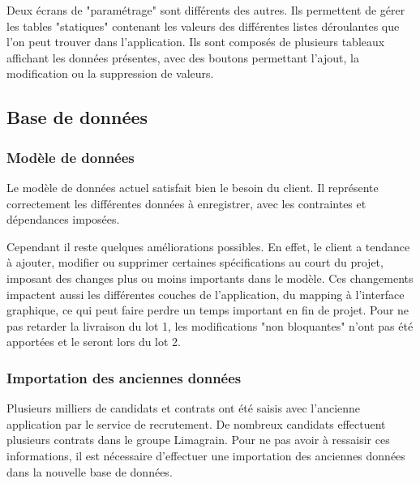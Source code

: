 Deux écrans de "paramétrage" sont différents des autres.
Ils permettent de gérer les tables "statiques" contenant les valeurs des différentes listes déroulantes que l'on peut trouver dans l'application.
Ils sont composés de plusieurs tableaux affichant les données présentes, avec des boutons permettant l'ajout, la modification ou la suppression de valeurs.


\subsection{Base de données}


\subsubsection{Modèle de données}

Le modèle de données actuel satisfait bien le besoin du client.
Il représente correctement les différentes données à enregistrer, avec les contraintes et dépendances imposées.

Cependant il reste quelques améliorations possibles.
En effet, le client a tendance à ajouter, modifier ou supprimer certaines spécifications au court du projet, imposant des changes plus ou moins importants dans le modèle.
Ces changements impactent aussi les différentes couches de l'application, du mapping à l'interface graphique, ce qui peut faire perdre un temps important en fin de projet.
Pour ne pas retarder la livraison du lot 1, les modifications "non bloquantes" n'ont pas été apportées et le seront lors du lot 2.


\subsubsection{Importation des anciennes données}

Plusieurs milliers de candidats et contrats ont été saisis avec l'ancienne application par le service de recrutement.
De nombreux candidats effectuent plusieurs contrats dans le groupe Limagrain.
Pour ne pas avoir à ressaisir ces informations, il est nécessaire d'effectuer une importation des anciennes données dans la nouvelle base de données.
\\

